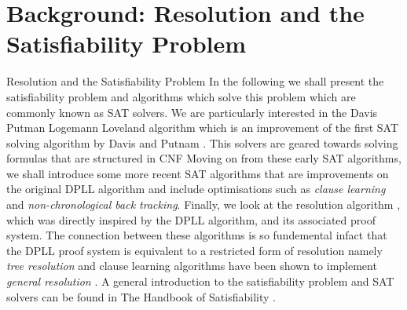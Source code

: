 \chapter{Background: Resolution and the Satisfiability Problem}{Resolution and the Satisfiability Problem}
\label{chapter:satbackground}
In the following we shall present the satisfiability problem and  algorithms which solve this problem which are commonly known as SAT solvers. We are particularly interested in the Davis Putman Logemann Loveland algorithm \cite{DPLL} which is an improvement of the first SAT solving algorithm by Davis and Putnam \cite{MD60}. This solvers are geared towards solving formulas that are structured in CNF Moving on from these early SAT algorithms, we shall introduce some more recent SAT algorithms that are improvements on the original DPLL algorithm and include optimisations such as \emph{clause learning} and \emph{non-chronological back tracking}. Finally, we look at the resolution algorithm \cite{JR65}, which was directly inspired by the DPLL algorithm, and its associated proof system. The connection between these algorithms is so fundemental infact that the DPLL proof system is equivalent to a restricted form of resolution namely \emph{tree resolution} \cite{} and clause learning algorithms have been shown to implement \emph{general resolution} \cite{}. A general introduction to the satisfiability problem and SAT solvers can be found in The Handbook of Satisfiability \cite{AB09b}.



